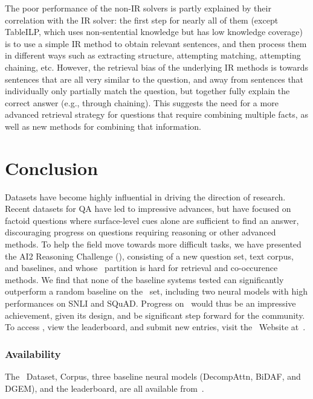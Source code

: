The poor performance of the non-IR solvers is partly explained by their correlation with the IR solver: the first step for nearly all of them (except TableILP, which uses non-sentential knowledge but has low knowledge coverage) is to use a simple IR method to obtain relevant sentences, and then process them in different ways such as extracting structure, attempting matching, attempting chaining, etc. However, the retrieval bias of the underlying IR methods is towards sentences that are all very similar to the question, and away from sentences that individually only partially match the question, but together fully explain the correct answer (e.g., through chaining). This suggests the need for a more advanced retrieval strategy for questions that require combining multiple facts, as well as new methods for combining that information.

\section{Conclusion}

Datasets have become highly influential in driving the direction of research. Recent datasets for QA have led to impressive advances, but have focused on factoid questions where surface-level cues alone are sufficient to find an answer, discouraging progress on questions requiring reasoning or other advanced methods. To help the field move towards more difficult tasks, we have presented the AI2 Reasoning Challenge (\ASC), consisting of a new question set, text corpus, and baselines, and whose \Challenge~partition is hard for retrieval and co-occurence methods. We find that none of the baseline systems tested can significantly outperform a random baseline on the \Challenge~set,
including two neural models with high performances on SNLI and SQuAD. Progress on \ASC~would thus be an impressive achievement, given its design, and be significant step forward for the community. To access \ASC, view the leaderboard, and submit new entries, visit the \ASC~Website at~\ascurl.

\subsubsection*{Availability}
The \ASC~Dataset, Corpus, three baseline neural models (DecompAttn, BiDAF, and DGEM), and the leaderboard, are all available from~\ascurl.


